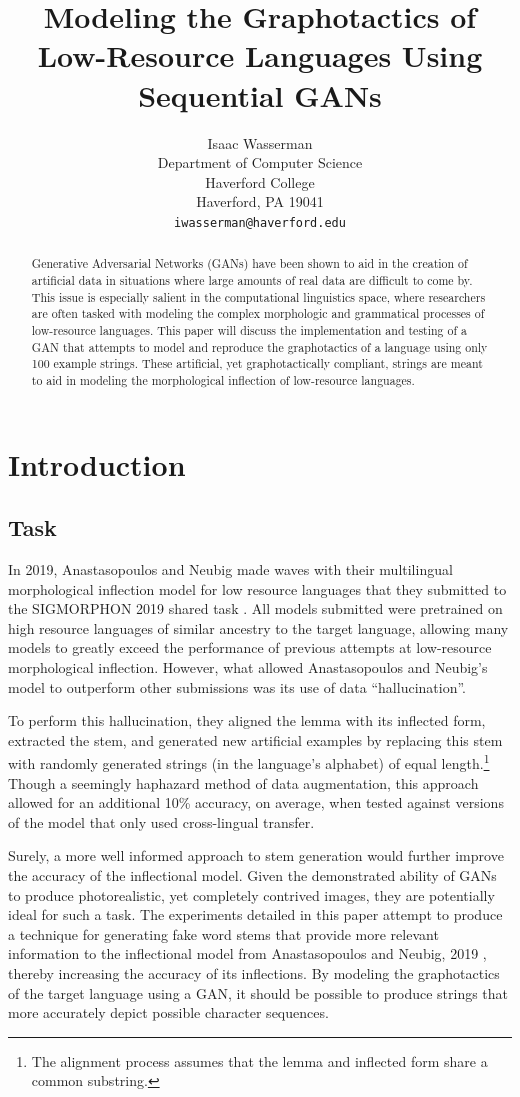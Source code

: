 \documentclass{article}
\title{Modeling the Graphotactics of Low-Resource Languages Using Sequential GANs}
\author{%
  Isaac Wasserman\\
  Department of Computer Science\\
  Haverford College\\
  Haverford, PA 19041\\
  \texttt{iwasserman@haverford.edu} \\
}
\begin{document}
  \maketitle
  \begin{abstract}
    Generative Adversarial Networks (GANs) have been shown to aid in the creation of artificial data in situations where large amounts of real data are difficult to come by. This issue is especially salient in the computational linguistics space, where researchers are often tasked with modeling the complex morphologic and grammatical processes of low-resource languages. This paper will discuss the implementation and testing of a GAN that attempts to model and reproduce the graphotactics of a language using only 100 example strings. These artificial, yet graphotactically compliant, strings are meant to aid in modeling the morphological inflection of low-resource languages.
  \end{abstract}
  \section{Introduction}
    \subsection{Task}
      In 2019, Anastasopoulos and Neubig made waves with their multilingual morphological inflection model for low resource languages \cite{CMU} that they submitted to the SIGMORPHON 2019 shared task \cite{sigmorphon2019}. All models submitted were pretrained on high resource languages of similar ancestry to the target language, allowing many models to greatly exceed the performance of previous attempts at low-resource morphological inflection. However, what allowed Anastasopoulos and Neubig's model to outperform other submissions was its use of data ``hallucination''.
    
      To perform this hallucination, they aligned the lemma with its inflected form, extracted the stem, and generated new artificial examples by replacing this stem with randomly generated strings (in the language's alphabet) of equal length.\footnote{The alignment process assumes that the lemma and inflected form share a common substring.} Though a seemingly haphazard method of data augmentation, this approach allowed for an additional 10\% accuracy, on average, when tested against versions of the model that only used cross-lingual transfer.

      Surely, a more well informed approach to stem generation would further improve the accuracy of the inflectional model. Given the demonstrated ability of GANs to produce photorealistic, yet completely contrived images, they are potentially ideal for such a task. The experiments detailed in this paper attempt to produce a technique for generating fake word stems that provide more relevant information to the inflectional model from Anastasopoulos and Neubig, 2019 \cite{CMU}, thereby increasing the accuracy of its inflections. By modeling the graphotactics of the target language using a GAN, it should be possible to produce strings that more accurately depict possible character sequences.
\end{document}

